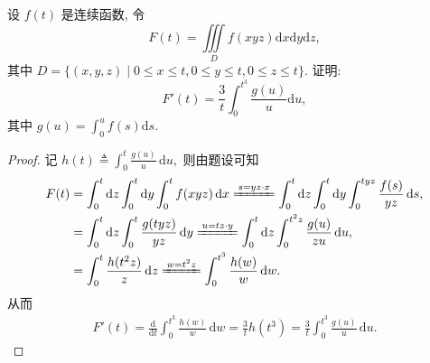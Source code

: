 \documentclass[../../main.tex]{subfiles}%
\begin{document}
\begin{example}
设 $f(t)$ 是连续函数, 令
\[
F(t) = \iiint\limits_{D} f(xyz) \mathrm{d}x \mathrm{d}y \mathrm{d}z,
\]
其中 $D = \{(x,y,z) \mid 0 \leqslant x \leqslant t, 0 \leqslant y \leqslant t, 0 \leqslant z \leqslant t\}$. 证明:
\[
F'(t) = \frac{3}{t} \int_0^{t^3} \frac{g(u)}{u} \mathrm{d}u,
\]
其中 $g(u) = \int_0^u f(s) \mathrm{d}s.$
\end{example}
\begin{proof}
记 $h(t) \triangleq \int_0^t \frac{g(u)}{u} \,\mathrm{d}u,$ 则由题设可知
\begin{align*}
F(t) &= \int_0^t \mathrm{d}z \int_0^t \mathrm{d}y \int_0^t f(xyz) \,\mathrm{d}x \xlongequal{s=yz\cdot x} \int_0^t \mathrm{d}z \int_0^t \mathrm{d}y \int_0^{tyz} \frac{f(s)}{yz} \,\mathrm{d}s, \\
&= \int_0^t \mathrm{d}z \int_0^t \frac{g(tyz)}{yz} \,\mathrm{d}y \xlongequal{u=tz\cdot y} \int_0^t \mathrm{d}z \int_0^{t^2z} \frac{g(u)}{zu} \,\mathrm{d}u, \\
&= \int_0^t \frac{h(t^2z)}{z} \,\mathrm{d}z \xlongequal{w=t^2z} \int_0^{t^3} \frac{h(w)}{w} \,\mathrm{d}w.
\end{align*}
从而
\begin{align*}
F'(t) = \frac{\mathrm{d}}{\mathrm{d}t} \int_0^{t^3} \frac{h(w)}{w} \,\mathrm{d}w = \frac{3}{t} h(t^3) = \frac{3}{t} \int_0^{t^3} \frac{g(u)}{u} \,\mathrm{d}u.
\end{align*}
\end{proof}
\end{document}
